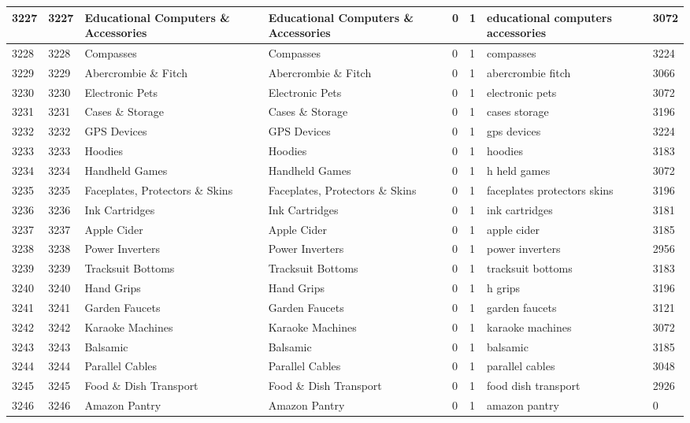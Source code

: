 \begin{longtable}{|l|l|l|l|l|l|l|l|}
3227 & 3227 & Educational Computers \& Accessories & Educational Computers \& Accessories & 0 & 1 & educational computers accessories & 3072 \\ \hline 
3228 & 3228 & Compasses & Compasses & 0 & 1 & compasses & 3224 \\ \hline 
3229 & 3229 & Abercrombie \& Fitch & Abercrombie \& Fitch & 0 & 1 & abercrombie fitch & 3066 \\ \hline 
3230 & 3230 & Electronic Pets & Electronic Pets & 0 & 1 & electronic pets & 3072 \\ \hline 
3231 & 3231 & Cases \& Storage & Cases \& Storage & 0 & 1 & cases storage & 3196 \\ \hline 
3232 & 3232 & GPS Devices & GPS Devices & 0 & 1 & gps devices & 3224 \\ \hline 
3233 & 3233 & Hoodies & Hoodies & 0 & 1 & hoodies & 3183 \\ \hline 
3234 & 3234 & Handheld Games & Handheld Games & 0 & 1 & h held games & 3072 \\ \hline 
3235 & 3235 & Faceplates, Protectors \& Skins & Faceplates, Protectors \& Skins & 0 & 1 & faceplates protectors skins & 3196 \\ \hline 
3236 & 3236 & Ink Cartridges & Ink Cartridges & 0 & 1 & ink cartridges & 3181 \\ \hline 
3237 & 3237 & Apple Cider & Apple Cider & 0 & 1 & apple cider & 3185 \\ \hline 
3238 & 3238 & Power Inverters & Power Inverters & 0 & 1 & power inverters & 2956 \\ \hline 
3239 & 3239 & Tracksuit Bottoms & Tracksuit Bottoms & 0 & 1 & tracksuit bottoms & 3183 \\ \hline 
3240 & 3240 & Hand Grips & Hand Grips & 0 & 1 & h grips & 3196 \\ \hline 
3241 & 3241 & Garden Faucets & Garden Faucets & 0 & 1 & garden faucets & 3121 \\ \hline 
3242 & 3242 & Karaoke Machines & Karaoke Machines & 0 & 1 & karaoke machines & 3072 \\ \hline 
3243 & 3243 & Balsamic & Balsamic & 0 & 1 & balsamic & 3185 \\ \hline 
3244 & 3244 & Parallel Cables & Parallel Cables & 0 & 1 & parallel cables & 3048 \\ \hline 
3245 & 3245 & Food \& Dish Transport & Food \& Dish Transport & 0 & 1 & food dish transport & 2926 \\ \hline 
3246 & 3246 & Amazon Pantry & Amazon Pantry & 0 & 1 & amazon pantry & 0 \\ \hline 

\end{longtable}
